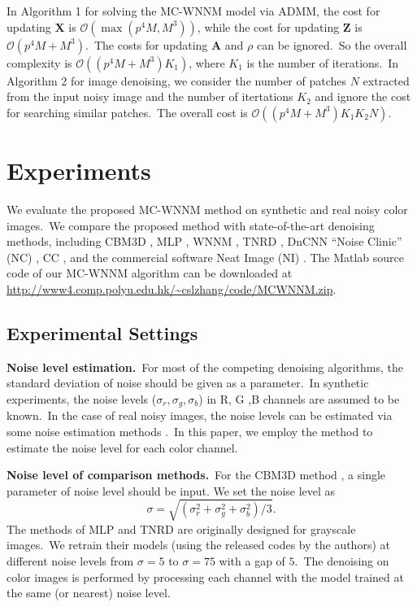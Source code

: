 In Algorithm 1 for solving the MC-WNNM model via ADMM, the cost for updating $\bm{X}$ is $\mathcal{O}(\max(p^{4}M, M^{3}))$, while the cost for updating $\bm{Z}$ is $\mathcal{O}(p^{4}M+M^{3})$.\ The costs for updating $\bm{A}$ and $\rho$ can be ignored.\ So the overall complexity is $\mathcal{O}((p^{4}M+M^{3})K_{1})$, where $K_{1}$ is the number of iterations.\ In Algorithm 2 for image denoising, we consider the number of patches $N$ extracted from the input noisy image and the number of itertations $K_{2}$ and ignore the cost for searching similar patches.\ The overall cost is $\mathcal{O}((p^{4}M+M^{3})K_{1}K_{2}N)$.

\section{Experiments}

We evaluate the proposed MC-WNNM method on synthetic and real noisy color images.\ We compare the proposed method with state-of-the-art denoising methods, including CBM3D \cite{cbm3d}, MLP \cite{mlp}, WNNM \cite{wnnm}, TNRD \cite{chen2015learning}, DnCNN \cite{dncnn} ``Noise Clinic'' (NC) \cite{noiseclinic,ncwebsite}, CC \cite{crosschannel2016}, and the commercial software Neat Image (NI) \cite{neatimage}. The Matlab source code of our MC-WNNM algorithm can be downloaded at \url{http://www4.comp.polyu.edu.hk/~cslzhang/code/MCWNNM.zip}.

\subsection{Experimental Settings}


\textbf{Noise level estimation.}\
For most of the competing denoising algorithms, the standard deviation of noise should be given as a parameter.\ In synthetic experiments, the noise levels ($\sigma_{r}, \sigma_{g}, \sigma_{b}$) in R, G ,B channels are assumed to be known.\ In the case of real noisy images, the noise levels can be estimated via some noise estimation methods \cite{noiselevel,Chen2015ICCV}.\ In this paper, we employ the method \cite{Chen2015ICCV} to estimate the noise level for each color channel. 

\textbf{Noise level of comparison methods.}\ 
For the CBM3D method \cite{cbm3d}, a single parameter of noise level should be input. We set the noise level as
\begin{equation}
\label{equ4-21}
\sigma = \sqrt{(\sigma_{r}^{2}+\sigma_{g}^{2}+\sigma_{b}^{2})/3}.
\end{equation}
The methods of MLP \cite{mlp} and TNRD \cite{chen2015learning} are originally designed for grayscale images.\ We retrain their models (using the released codes by the authors) at different noise levels from $\sigma=5$ to $\sigma=75$ with a gap of $5$.\ The denoising on color images is performed by processing each channel with the model trained at the same (or nearest) noise level. 

